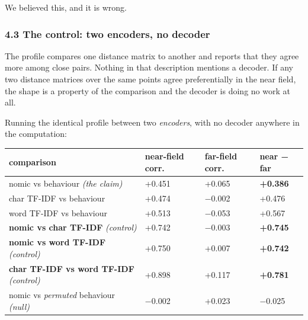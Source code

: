 \documentclass[
  10pt,
]{article}
\theoremstyle{plain}
\theoremstyle{definition}
\begin{document}
We believed this, and it is wrong.

\subsubsection{4.3 The control: two encoders, no
decoder}\label{43-the-control-two-encoders-no-decoder}

The profile compares one distance matrix to another and reports that
they agree more among close pairs. Nothing in that description mentions
a decoder. If any two distance matrices over the same points agree
preferentially in the near field, the shape is a property of the
comparison and the decoder is doing no work at all.

Running the identical profile between two \emph{encoders}, with no
decoder anywhere in the computation:

{\footnotesize
\begin{longtable}[]{@{}>{\raggedright\arraybackslash}p{}>{\raggedright\arraybackslash}p{}>{\raggedright\arraybackslash}p{}>{\raggedright\arraybackslash}p{}@{}}
\toprule\noalign{}
comparison & near-field corr. & far-field corr. & \textbf{near − far} \\
\midrule\noalign{}
\endhead
\bottomrule\noalign{}
\endlastfoot
nomic vs behaviour \emph{(the claim)} & +0.451 & +0.065 &
\textbf{+0.386} \\
char TF-IDF vs behaviour & +0.474 & −0.002 & +0.476 \\
word TF-IDF vs behaviour & +0.513 & −0.053 & +0.567 \\
\textbf{nomic vs char TF-IDF} \emph{(control)} & +0.742 & −0.003 &
\textbf{+0.745} \\
\textbf{nomic vs word TF-IDF} \emph{(control)} & +0.750 & +0.007 &
\textbf{+0.742} \\
\textbf{char TF-IDF vs word TF-IDF} \emph{(control)} & +0.898 & +0.117 &
\textbf{+0.781} \\
nomic vs \emph{permuted} behaviour \emph{(null)} & −0.002 & +0.023 &
−0.025 \\
\end{longtable}}
\end{document}
